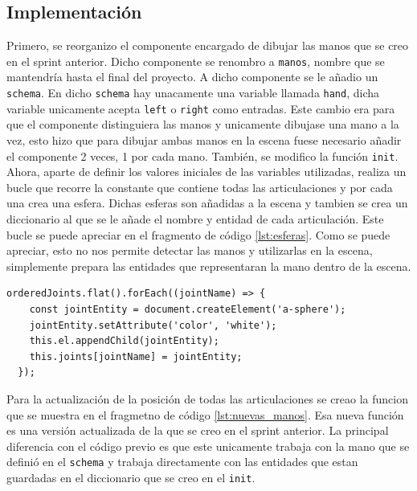 \documentclass[a4paper, 12pt]{book}
\begin{document}
\subsection{Implementación}
\label{subsec:implementacion2}
Primero, se reorganizo el componente encargado de dibujar las manos que se creo en el sprint anterior. Dicho componente se renombro a \texttt{manos}, nombre que se mantendría hasta el final del proyecto. A dicho componente se le añadio un \texttt{schema}. 
En dicho \texttt{schema} hay unacamente una variable llamada \texttt{hand}, dicha variable unicamente acepta \texttt{left} o \texttt{right} como entradas. Este cambio era para que el componente distinguiera las manos y unicamente dibujase una mano a la vez, esto hizo que para dibujar ambas manos en la escena fuese necesario añadir el componente 2 veces, 1 por cada mano. 
También, se modifico la función \texttt{init}. Ahora, aparte de definir los valores iniciales de las variables utilizadas, realiza un bucle que recorre la constante que contiene todas las articulaciones y por cada una crea una esfera. Dichas esferas son añadidas a la escena y tambien se crea un diccionario al que se le añade el nombre y entidad de cada articulación.
Este bucle se puede apreciar en el fragmento de código \ref{lst:esferas}. Como se puede apreciar, esto no nos permite detectar las manos y utilizarlas en la escena, simplemente prepara las entidades que representaran la mano dentro de la escena.

\begin{lstlisting}[caption=Creación de las esferas de las articulaciones, captionpos=b, label=lst:esferas]
  orderedJoints.flat().forEach((jointName) => {
    const jointEntity = document.createElement('a-sphere');
    jointEntity.setAttribute('color', 'white'); 
    this.el.appendChild(jointEntity);
    this.joints[jointName] = jointEntity;
  });
\end{lstlisting}

Para la actualización de la posición de todas las articulaciones se creao la funcion que se muestra en el fragmetno de código \ref{lst:nuevas_manos}. Esa nueva función es una versión actualizada de la que se creo en el sprint anterior. 
La principal diferencia con el código previo es que este unicamente trabaja con la mano que se definió en el \texttt{schema} y trabaja directamente con las entidades que estan guardadas en el diccionario que se creo en el \texttt{init}. 
\end{document}
